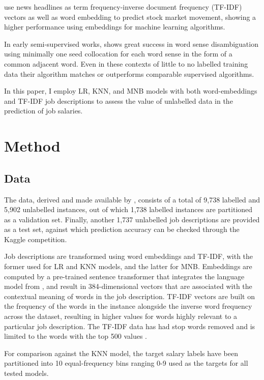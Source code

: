 \documentclass[11pt]{article}
\begin{document}
\citet{Liu2020} use news headlines as term frequency-inverse document frequency (TF-IDF) 
vectors as well as word embedding to predict stock market movement, 
showing a higher performance using embeddings for machine learning algorithms.

In early semi-supervised works, \citet{Yarowsky1995} shows great success in 
word sense disambiguation using minimally one seed collocation for each 
word sense in the form of a common adjacent word. Even in these contexts of 
little to no labelled training data their algorithm matches or outperforms comparable supervised algorithms. 

In this paper, I employ LR, KNN, and 
MNB models with both word-embeddings and TF-IDF job 
descriptions to assess the value of unlabelled data in the prediction of job salaries.

\section{Method}

\subsection{Data}

The data, derived and made available by \citet{Bhola2020}, consists of a total of 9,738 labelled and 5,902 unlabelled instances, 
out of which 1,738 labelled instances are partitioned as a validation set. 
Finally, another 1,737 unlabelled job descriptions are provided as a test set, 
against which prediction accuracy can be checked through the Kaggle competition.

Job descriptions are transformed using word embeddings and TF-IDF, 
with the former used for LR and KNN models, and the latter for MNB. 
Embeddings are computed by a pre-trained sentence transformer that 
integrates the language model from \citet{Reimers2019}, and 
result in 384-dimensional vectors that are associated with the contextual meaning 
of words in the job description. TF-IDF vectors are built on the frequency of 
the words in the instance alongside the inverse word frequency across 
the dataset, resulting in higher values for words highly relevant to a 
particular job description. The TF-IDF data has had stop words removed and is 
limited to the words with the top 500 values \citep{Shutze2008}.

For comparison against the KNN model, the target salary labels have been 
partitioned into 10 equal-frequency bins ranging 0-9 used as the targets for all tested models.
\end{document}
